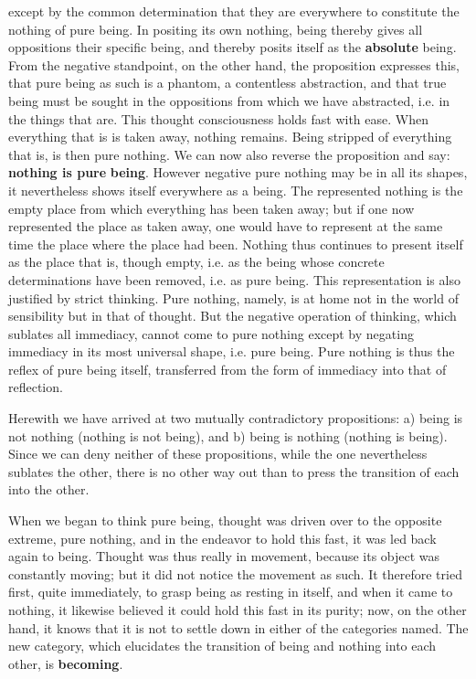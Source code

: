 \documentclass[12pt,a4paper,openany]{book}
\newcommand{\opage}[1]{\marginnote{\footnotesize\textit{[#1]}}}
\begin{document}
except by the common determination that they are everywhere
to constitute the nothing of pure being. In positing its own nothing, being thereby gives all oppositions
their specific being, and thereby posits itself
as the \textbf{absolute} being. From the negative standpoint, on the other hand, the proposition
expresses this, that pure being as such is a
phantom, a contentless abstraction, and that true
being must be sought in the oppositions from which we have
abstracted, i.e. in the things that are. This thought
consciousness holds fast with ease. When everything that is
is taken away, nothing remains. Being stripped of everything
that is, is then pure nothing. We can now also reverse the proposition and say:
\textbf{nothing is pure} \textbf{being}. However negative pure
nothing may be in all its shapes, it nevertheless shows itself
everywhere as a being. The represented nothing is
the empty place from which everything has been taken away; but if one
now represented the place as taken away, one would have to
represent at the same time the place where the place
had been. Nothing thus continues to present itself
as the place that is, though empty, i.e. as the
being whose concrete determinations have been removed,
i.e. as pure being. This representation is also justified
by strict thinking. Pure nothing, namely, is at home not in the world of sensibility but in
that of thought. But the negative operation of thinking, which sublates all immediacy, cannot come
to pure nothing except by negating immediacy
in its most universal shape, i.e. pure being. Pure nothing is thus the reflex of pure
\setcounter{footnote}{0}%
\opage{6}being itself, transferred from the form of immediacy into that of reflection.

Herewith we have arrived at two mutually contradictory
propositions: a) being is not nothing (nothing is
not being), and b) being is nothing (nothing is being). Since we can deny neither of these propositions,
while the one nevertheless sublates the other, there is
no other way out than to press the transition of each into
the other.

When we began to think pure being,
thought was driven over to the opposite extreme, pure
nothing, and in the endeavor to hold this fast,
it was led back again to being. Thought was thus
really in movement, because its object was constantly
moving; but it did not notice the movement as
such. It therefore tried first, quite immediately,
to grasp being as resting in itself, and when it came to
nothing, it likewise believed it could hold this fast in its
purity; now, on the other hand, it knows that it is not to settle
down in either of the categories named. The
new category, which elucidates the transition of being and nothing
into each other, is \textbf{becoming}.
\end{document}
